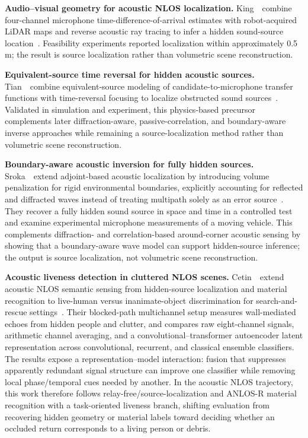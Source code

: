 \vspace{0.8mm}
\noindent \textbf{Audio--visual geometry for acoustic NLOS localization.}
King~\etal~combine four-channel microphone time-difference-of-arrival estimates with robot-acquired LiDAR maps and reverse acoustic ray tracing to infer a hidden sound-source location~\cite{king2021audiovisualnlos}. Feasibility experiments reported localization within approximately 0.5\,m; the result is source localization rather than volumetric scene reconstruction.

\vspace{0.8mm}
\noindent \textbf{Equivalent-source time reversal for hidden acoustic sources.}
Tian~\etal~combine equivalent-source modeling of candidate-to-microphone transfer functions with time-reversal focusing to localize obstructed sound sources~\cite{tianEquivalentSourceTimeReversalNLOS2024}. Validated in simulation and experiment, this physics-based precursor complements later diffraction-aware, passive-correlation, and boundary-aware inverse approaches while remaining a source-localization method rather than volumetric scene reconstruction.

\vspace{0.8mm}
\noindent \textbf{Boundary-aware acoustic inversion for fully hidden sources.}
Sroka~\etal~extend adjoint-based acoustic localization by introducing volume penalization for rigid environmental boundaries, explicitly accounting for reflected and diffracted waves instead of treating multipath solely as an error source~\cite{srokaPhysicsInformedAcousticNLOS2026}. They recover a fully hidden sound source in space and time in a controlled test and examine experimental microphone measurements of a moving vehicle. This complements diffraction- and correlation-based around-corner acoustic sensing by showing that a boundary-aware wave model can support hidden-source inference; the output is source localization, not volumetric scene reconstruction.

\vspace{0.8mm}
\noindent \textbf{Acoustic liveness detection in cluttered NLOS scenes.}
Cetin~\etal~extend acoustic NLOS semantic sensing from hidden-source localization and material recognition to live-human versus inanimate-object discrimination for search-and-rescue settings~\cite{cetinAcousticLivenessNLOS2026}. Their blocked-path multichannel setup measures wall-mediated echoes from hidden people and clutter, and compares raw eight-channel signals, arithmetic channel averaging, and a convolutional--transformer autoencoder latent representation across convolutional, recurrent, and classical ensemble classifiers. The results expose a representation--model interaction: fusion that suppresses apparently redundant signal structure can improve one classifier while removing local phase/temporal cues needed by another. In the acoustic NLOS trajectory, this work therefore follows relay-free/source-localization and ANLOS-R material recognition with a task-oriented liveness branch, shifting evaluation from recovering hidden geometry or material labels toward deciding whether an occluded return corresponds to a living person or debris.


